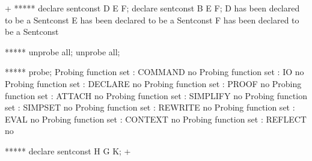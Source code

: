 



\gfexample+
   ***** declare sentconst D E F;
   declare sentconst B E F;
   D has been declared to be a Sentconst
   E has been declared to be a Sentconst
   F has been declared to be a Sentconst
   
   ***** unprobe all;
   unprobe all;

   ***** probe;
   Probing function set : COMMAND no
   Probing function set : IO no
   Probing function set : DECLARE no
   Probing function set : PROOF no
   Probing function set : ATTACH no
   Probing function set : SIMPLIFY no
   Probing function set : SIMPSET no
   Probing function set : REWRITE no
   Probing function set : EVAL no
   Probing function set : CONTEXT no
   Probing function set : REFLECT no
   
   ***** declare sentconst H G K;
+

\gfnotes{}
